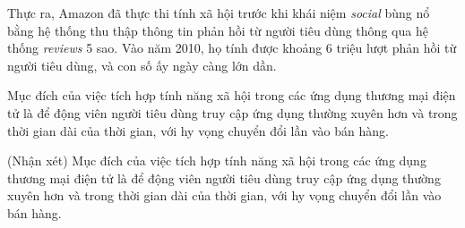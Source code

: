 Thực ra, Amazon đã thực thi tính xã hội trước khi khái niệm \textit{social} bùng nổ bằng hệ thống thu thập thông tin phản hồi từ người tiêu dùng thông qua hệ thống \textit{reviews} 5 sao. Vào năm 2010, họ tính được khoảng 6 triệu lượt phản hồi từ người tiêu dùng, và con số ấy ngày càng lớn dần.

Mục đích của việc tích hợp tính năng xã hội trong các ứng dụng thương mại điện tử là để động viên người tiêu dùng truy cập ứng dụng thường xuyên hơn và trong thời gian dài của thời gian, với hy vọng chuyển đổi lần vào bán hàng.

(Nhận xét)
Mục đích của việc tích hợp tính năng xã hội trong các ứng dụng thương mại điện tử là để động viên người tiêu dùng truy cập ứng dụng thường xuyên hơn và trong thời gian dài của thời gian, với hy vọng chuyển đổi lần vào bán hàng.